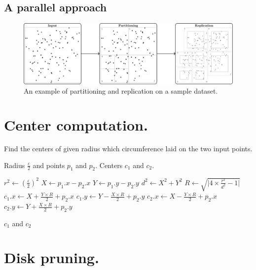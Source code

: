 \documentclass[journal,onecolumn]{IEEEtran}
\begin{document}
\subsection{A parallel approach}
\begin{figure}[!ht]
    \centering
    \includegraphics[width=\textwidth]{figures/MF_stages/P123}
    \caption{An example of partitioning and replication on a sample dataset.}\label{fig:partrep}
\end{figure}


\newpage 

\appendices
\section{Center computation.}\label{app:centers}

\begin{algorithm}
    \caption{Find the centers of given radius which circumference laid on the two input points.}
    \begin{algorithmic}[1]
        \Require Radius $\frac{\varepsilon}{2}$ and points $p_1$ and $p_2$.
        \Ensure Centers $c_1$ and $c_2$.
        
        \State $r^2 \gets (\frac{\varepsilon}{2})^2$
        \State $X \gets p_1.x - p_2.x$
        \State $Y \gets p_1.y - p_2.y$
        \State $d^2 \gets X^2 + Y^2$
        \State $R \gets \sqrt{\lvert 4 \times \frac{r^2}{d^2} - 1 \rvert}$
        \State $c_1.x \gets X + \frac{Y \times R}{2} + p_2.x$
        \State $c_1.y \gets Y - \frac{X \times R}{2} + p_2.y$
        \State $c_2.x \gets X - \frac{Y \times R}{2} + p_2.x$
        \State $c_2.y \gets Y + \frac{X \times R}{2} + p_2.y$
        
        \State \Return $c_1$ and $c_2$
        \EndFunction
    \end{algorithmic}
\end{algorithm}

\newpage

\section{Disk pruning.}\label{app:disks}
\end{document}
